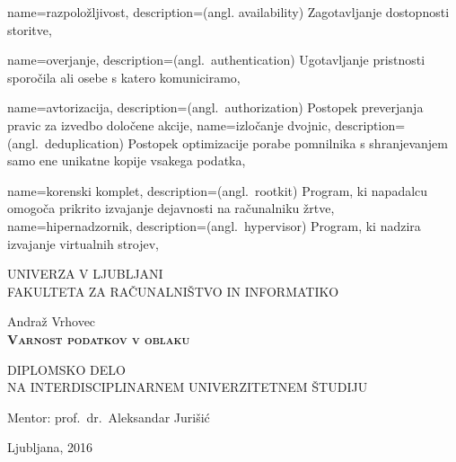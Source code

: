 \documentclass[12pt,a4paper,openany,tikz]{book}
\theoremstyle{plain}
\theoremstyle{definition}
\begin{document}
{
  name=razpoložljivost,
  description={(angl. availability) Zagotavljanje dostopnosti storitve},
}

{
  name=overjanje,
  description={(angl.\ authentication) Ugotavljanje pristnosti sporočila ali osebe s katero komuniciramo},
}

{
  name=avtorizacija,
  description={(angl.\ authorization) Postopek preverjanja pravic za izvedbo določene akcije},
}
{
  name=izločanje dvojnic,
  description={(angl.\ deduplication) Postopek optimizacije porabe pomnilnika s shranjevanjem samo ene unikatne kopije vsakega podatka},
}

{
  name=korenski komplet,
  description={(angl.\ rootkit) Program, ki napadalcu omogoča prikrito izvajanje dejavnosti na računalniku žrtve},
}
{
  name=hipernadzornik,
  description={(angl.\ hypervisor) Program, ki nadzira izvajanje virtualnih strojev},
}


\begin{center}
{\large
UNIVERZA V LJUBLJANI\\
FAKULTETA ZA RAČUNALNIŠTVO IN INFORMATIKO\\
}

\vspace{3cm}
{\LARGE Andraž Vrhovec}\\

\vspace{2cm}
\textsc{\textbf{\LARGE
Varnost podatkov v oblaku
}}

\vspace{2cm}
{ DIPLOMSKO DELO}\\
{ NA INTERDISCIPLINARNEM UNIVERZITETNEM ŠTUDIJU
}


\vspace{2cm}
{\Large Mentor: prof.\ dr.\ Aleksandar Jurišić}

\vfill
{\Large Ljubljana, 2016}
\end{center}


\cleardoublepage
\end{document}
